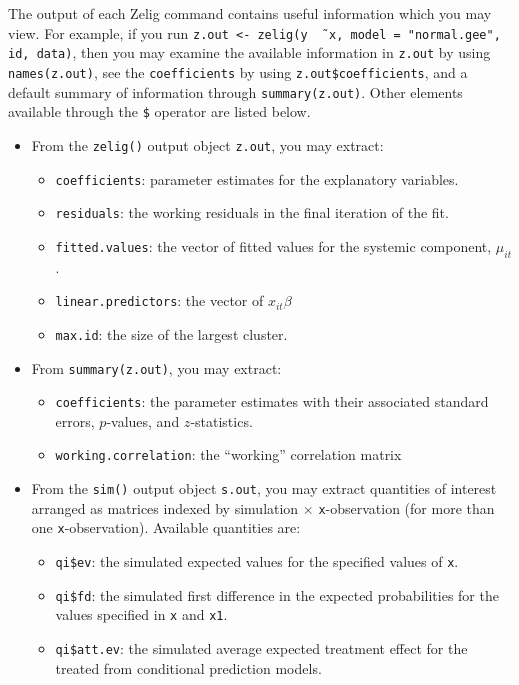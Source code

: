 The output of each Zelig command contains useful information which you
may view.  For example, if you run \texttt{z.out <- zelig(y \~\, x,
  model = "normal.gee", id, data)}, then you may examine the available
information in \texttt{z.out} by using \texttt{names(z.out)},
see the {\tt coefficients} by using {\tt z.out\$coefficients}, and
a default summary of information through \texttt{summary(z.out)}.
Other elements available through the {\tt \$} operator are listed
below.

\begin{itemize}
\item From the {\tt zelig()} output object {\tt z.out}, you may
  extract:
   \begin{itemize}
   \item {\tt coefficients}: parameter estimates for the explanatory
     variables.
   \item {\tt residuals}: the working residuals in the final iteration
     of the fit.
   \item {\tt fitted.values}: the vector of fitted values for the
     systemic component, $\mu_{it}$.
   \item {\tt linear.predictors}: the vector of $x_{it}\beta$
   \item {\tt max.id}: the size of the largest cluster.
   \end{itemize}

\item From {\tt summary(z.out)}, you may extract:
   \begin{itemize}
   \item {\tt coefficients}: the parameter estimates with their
     associated standard errors, $p$-values, and $z$-statistics.
   \item {\tt working.correlation}: the ``working'' correlation matrix
   \end{itemize}

\item From the {\tt sim()} output object {\tt s.out}, you may extract
  quantities of interest arranged as matrices indexed by simulation
  $\times$ {\tt x}-observation (for more than one {\tt x}-observation).
  Available quantities are:

   \begin{itemize}
   \item {\tt qi\$ev}: the simulated expected values for the
     specified values of {\tt x}.
   \item {\tt qi\$fd}: the simulated first difference in the expected
     probabilities for the values specified in {\tt x} and {\tt x1}.
   \item {\tt qi\$att.ev}: the simulated average expected treatment
     effect for the treated from conditional prediction models.
   \end{itemize}
\end{itemize}

